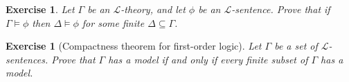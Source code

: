 \documentclass{article}
\theoremstyle{plain}
\newtheorem{Q}[theorem]{Exercise}{\bfseries}{\upshape}
\newcommand{\sL}{\mathscr{L}}
\begin{document}
\begin{Q}
Let $\Gamma$ be an $\sL$-theory, and let $\phi$ be an $\sL$-sentence. Prove that if $\Gamma\models \phi$ then $\Delta\models \phi$ for some finite $\Delta\subseteq \Gamma$.
\end{Q}
\begin{comment}
\textbf{Solution:}
Suppose $\Gamma\models \phi$. Then, by completeness we have $\Gamma\vdash \phi$. So there is a deduction tree using $\Gamma$ that proves $\phi$. As deduction trees are finite, this tree involves only a finite number of sentences from $\Gamma$. Define $\Delta$ to be the set of sentences from $\Gamma$ used in the proof of $\phi$. Then $\Delta\vdash \phi$, and so $\Delta\models \phi$ by soundness. 
\end{comment}

\begin{Q}[Compactness theorem for first-order logic] Let $\Gamma$ be a set of $\sL$-sentences. Prove that $\Gamma$ has a model if and only if every finite subset of $\Gamma$ has a model. 
\end{Q}
\begin{comment}
\textbf{Solution:}
This is very similar to exercise \ref{compactness}. First, if $\Gamma$ has a model then every subset of $\Gamma$ obviously has a model too. Conversely, suppose $\Gamma$ does \emph{not} have a model. Then $\Gamma\models \bot$. So by exercise 4 there is finite $\Delta\subseteq \Gamma$ with $\Delta\models \bot$. I.e. $\Delta$ does not have a model. 
\end{comment}
\end{document}
